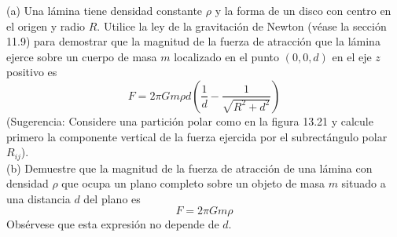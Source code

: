\item (a) Una lámina tiene densidad constante $\rho$ y la forma de un disco con centro en el origen y radio $R$. Utilice la ley de la gravitación de Newton (véase la sección 11.9) para demostrar que la magnitud de la fuerza de atracción que la lámina ejerce sobre un cuerpo de masa $m$ localizado en el punto $(0, 0, d)$ en el eje $z$ positivo es
\[ F = 2\pi G m \rho d \left( \frac{1}{d} - \frac{1}{\sqrt{R^2 + d^2}} \right) \]
(Sugerencia: Considere una partición polar como en la figura 13.21 y calcule primero la componente vertical de la fuerza ejercida por el subrectángulo polar $R_{ij}$). \\
(b) Demuestre que la magnitud de la fuerza de atracción de una lámina con densidad $\rho$ que ocupa un plano completo sobre un objeto de masa $m$ situado a una distancia $d$ del plano es
\[ F = 2\pi G m \rho \]
Obsérvese que esta expresión no depende de $d$.
